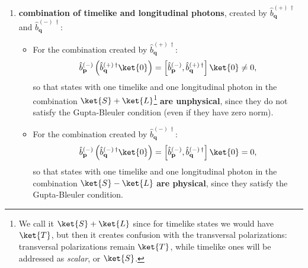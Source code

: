 \begin{enumerate}
\[\begin{aligned}
                                                                                                                 & = \frac{1}{2}\left[ \hat{b}^{(-)\,\dagger}_{\mathbf{p}} ,\, \hat{b}^{(+)\,\dagger}_{\mathbf{p}}  \right] -\frac{1}{2} \left[ \hat{b}^{(-)\,\dagger}_{\mathbf{p}} ,\, \hat{b}^{(-)\,\dagger}_{\mathbf{p}} \right] \\
                                                                                                                 & = \frac{1}{2}\left[ \hat{b}^{(-)\,\dagger}_{\mathbf{p}} ,\, \hat{b}^{(+)\,\dagger}_{\mathbf{p}}  \right] \neq 0.
              \end{aligned}
          \]
          This shows that longitudinal photons alone \textbf{form unphysical states}, since they do not satisfy the Gupta-Bleuler condition. This is expected, since longitudinal photons have negative norm.
    \item \textbf{combination of timelike and longitudinal photons}, created by \(\hat{b}^{(+)\,\dagger}_{\mathbf{q}}\) and \(\hat{b}^{(-)\,\dagger}_{\mathbf{q}}\):
          \begin{itemize}
              \item For the combination created by \(\hat{b}^{(+)\,\dagger}_{\mathbf{q}}\):
                    \[
                        \hat{b}^{(-)}_{\mathbf{p}} \left( \hat{b}^{(+)\,\dagger}_{\mathbf{q}} \ket{0} \right) = \left[ \hat{b}^{(-)}_{\mathbf{p}}, \hat{b}^{(+)\,\dagger}_{\mathbf{q}} \right] \ket{0} \neq 0,
                    \]
                    so that states with one timelike and one longitudinal photon in the combination \(\ket{S}+\ket{L}\)\footnote{We call it \(\ket{S} + \ket{L}\) since for timelike states we would have \(\ket{T}\), but then it creates confusion with the transversal polarizations: transversal polarizations remain \(\ket{T}\), while timelike ones will be addressed as \textit{scalar}, or \(\ket{S}\).} \textbf{are unphysical}, since they do not satisfy the Gupta-Bleuler condition (even if they have zero norm).
              \item For the combination created by \(\hat{b}^{(-)\,\dagger}_{\mathbf{q}}\):
                    \[
                        \hat{b}^{(-)}_{\mathbf{p}} \left( \hat{b}^{(-)\,\dagger}_{\mathbf{q}} \ket{0} \right) = \left[ \hat{b}^{(-)}_{\mathbf{p}}, \hat{b}^{(-)\,\dagger}_{\mathbf{q}} \right] \ket{0} = 0,
                    \]
                    so that states with one timelike and one longitudinal photon in the combination \(\ket{S}-\ket{L}\) \textbf{are physical}, since they satisfy the Gupta-Bleuler condition.
          \end{itemize}
\end{enumerate}

